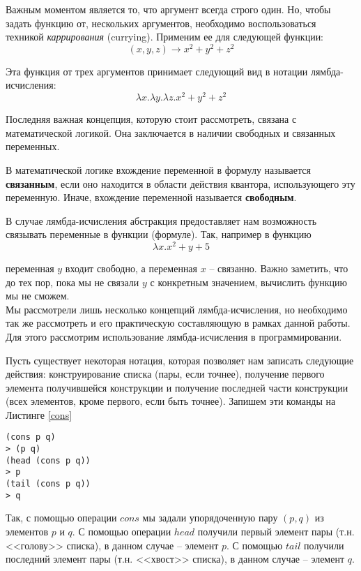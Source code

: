 \documentclass[a4paper,14pt]{extreport} %
\begin{document}
Важным моментом является то, что аргумент всегда строго один. Но, чтобы задать функцию от, нескольких аргументов, необходимо воспользоваться техникой \textit{каррирования} (currying). Применим ее для следующей функции:
$$ (x,y,z) \rightarrow x^2 + y^2 + z^2$$

Эта функция от трех аргументов принимает следующий вид в нотации лямбда-исчисления:
$$ \lambda x . \lambda y . \lambda z . x^2+y^2+z^2 $$

Последняя важная концепция, которую стоит рассмотреть, связана с математической логикой. Она заключается в наличии свободных и связанных переменных.

В математической логике вхождение переменной в формулу называется \textbf{связанным}, если оно находится в области действия квантора, использующего эту переменную. Иначе, вхождение переменной называется \textbf{свободным}.

В случае лямбда-исчисления абстракция предоставляет нам возможность связывать переменные в функции (формуле). Так, например в функцию
$$ \lambda x . x^2+y+5 $$

переменная $y$ входит свободно, а переменная $x$ -- связанно. Важно заметить, что до тех пор, пока мы не связали $y$ с конкретным значением, вычислить функцию мы не сможем. \\



Мы рассмотрели лишь несколько концепций лямбда-исчисления, но необходимо так же рассмотреть и его практическую составляющую в рамках данной работы. Для этого рассмотрим использование лямбда-исчисления в программировании.

Пусть существует некоторая нотация, которая позволяет нам записать следующие действия: конструирование списка (пары, если точнее), получение первого элемента получившейся конструкции и получение последней части конструкции (всех элементов, кроме первого, если быть точнее). Запишем эти команды на Листинге \ref{cons}

\begin{lstlisting}[caption={Действия над парой элементов}, label={cons}]
(cons p q)
> (p q)
(head (cons p q))
> p
(tail (cons p q))
> q
\end{lstlisting}

Так, с помощью операции $cons$ мы задали упорядоченную пару $(p, q)$ из элементов $p$ и $q$. С помощью операции $head$ получили первый элемент пары (т.н. <<голову>> списка), в данном случае -- элемент $p$. С помощью $tail$ получили последний элемент пары (т.н. <<хвост>> списка), в данном случае -- элемент $q$.
\end{document}
